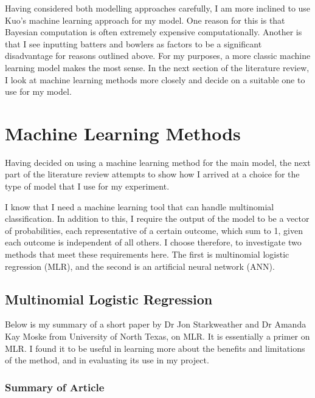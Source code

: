 
Having considered both modelling approaches carefully, I am more inclined to use Kuo’s machine learning approach for my model. One reason for this is that Bayesian computation is often extremely expensive computationally. Another is that I see inputting batters and bowlers as factors to be a significant disadvantage for reasons outlined above. For my purposes, a more classic machine learning model makes the most sense. In the next section of the literature review, I look at machine learning methods more closely and decide on a suitable one to use for my model.

\section{Machine Learning Methods}

Having decided on using a machine learning method for the main model, the next part of the literature review attempts to show how I arrived at a choice for the type of model that I use for my experiment.

I know that I need a machine learning tool that can handle multinomial classification. In addition to this, I require the output of the model to be a vector of probabilities, each representative of a certain outcome, which sum to 1, given each outcome is independent of all others. I choose therefore, to investigate two methods that meet these requirements here. The first is multinomial logistic regression (MLR), and the second is an artificial neural network (ANN).

\subsection{Multinomial Logistic Regression}

Below is my summary of a short paper by Dr Jon Starkweather and Dr Amanda Kay Moske from University of North Texas, on MLR.\cite{starkweather_multinomial_2011} It is essentially a primer on MLR. I found it to be useful in learning more about the benefits and limitations of the method, and in evaluating its use in my project.

\subsubsection{Summary of Article}

